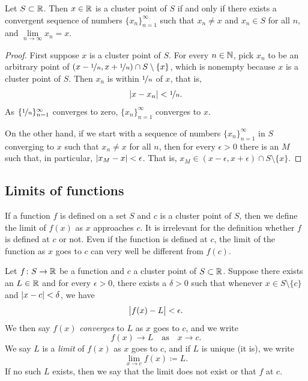 \begin{prop}
Let $S \subset {\mathbb{R}}$.  Then $x \in {\mathbb{R}}$ is a cluster point of $S$
if and only if
there exists a convergent sequence of numbers $\{ x_n \}_{n=1}^\infty$ such that
$x_n \neq x$ and $x_n \in S$ for all $n$, and $\lim\limits_{n\to\infty} x_n = x$.
\end{prop}

\begin{proof}
First suppose $x$ is a cluster point of $S$.
For every $n \in {\mathbb{N}}$, pick $x_n$ to be an arbitrary point of
$(x-\nicefrac{1}{n},x+\nicefrac{1}{n}) \cap S \setminus \{x\}$, which
is nonempty because $x$ is a cluster point of $S$.
Then
$x_n$ is within $\nicefrac{1}{n}$ of $x$, that is,
\begin{equation*}
\sabs{x-x_n} < \nicefrac{1}{n} .
\avoidbreak
\end{equation*}
As $\{ \nicefrac{1}{n} \}_{n=1}^\infty$ converges to zero,
$\{ x_n \}_{n=1}^\infty$ converges to $x$.

On the other hand, if we start with a sequence of numbers
$\{ x_n \}_{n=1}^\infty$ in $S$
converging to $x$ such that $x_n \neq x$ for all $n$, then for every
$\epsilon > 0$ there is an $M$ such that, in particular, $\lvert {x_M - x} \rvert <
\epsilon$.  That is, $x_M \in (x-\epsilon,x+\epsilon) \cap S \setminus \{x\}$.
\end{proof}

\subsection{Limits of functions}

If a function $f$ is defined on a set $S$ and $c$ is a cluster point of $S$,
then we define the limit of $f(x)$ as $x$ approaches $c$.  
It is irrelevant for the definition whether $f$ is defined at $c$ or not.
Even if the function is defined at $c$, the limit of the
function as $x$ goes to $c$ can very well be different
from $f(c)$.

\begin{defn}
%
Let $f \colon S \to {\mathbb{R}}$ be a function and $c$ a cluster point of
$S \subset {\mathbb{R}}$.
Suppose there exists an $L \in {\mathbb{R}}$ and for every $\epsilon > 0$,
there exists a $\delta > 0$ such that whenever $x \in S \setminus \{ c \}$
and $\lvert {x - c} \rvert < \delta$, we have
\begin{equation*}
\bigl\lvert {f(x) - L} \bigr\rvert < \epsilon .
\end{equation*}
We then say $f(x)$ \emph{converges} to $L$ as $x$ goes
to $c$, and we write
%
\begin{equation*}
f(x) \to L \quad\text{as}\quad x \to c .
\end{equation*}
We say $L$ is a \emph{limit} of $f(x)$ as $x$
goes to $c$, and if $L$ is unique (it is), we write
%
\begin{equation*}
\lim_{x \to c} f(x) \coloneqq L .
\end{equation*}
If no such $L$ exists, then we say that the limit does not exist or
that $f$ \emph{} at $c$.
\end{defn}

